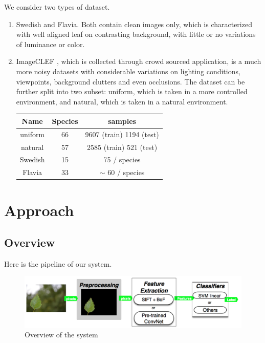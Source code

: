 \documentclass[journal, 10pt]{IEEEtran}
\begin{document}
    We consider two types of dataset.
\begin{enumerate}
  \item Swedish\cite{SwedishLeafDataset} and Flavia\cite{FlaviaDataset}. Both contain clean images only, which is characterized with well aligned leaf on contrasting background, with little or no variations of luminance or color. \\

  \item ImageCLEF \cite{ImageCLEF2013}, which is collected through crowd sourced application, is a much more noisy datasets with considerable variations on lighting conditions, viewpoints, background clutters and even occlusions. The dataset can be further split into two subset: uniform, which is taken in a more controlled environment, and natural, which is taken in a natural environment.
  \begin{centering}
    \centering
      \begin{tabular}{| c | c | c |}
      \hline
      Name    & Species & samples                  \\ \hline
      uniform & 66      & 9607 (train) 1194 (test) \\ \hline
      natural & 57      & 2585 (train) 521  (test) \\ \hline
      Swedish & 15      & 75 / species             \\ \hline
      Flavia  & 33      & $\sim$ 60 / species      \\ \hline
      \end{tabular}
  \end{centering}
\end{enumerate}

\section{Approach}

\subsection{Overview}
Here is the pipeline of our system.
\begin{figure}[H]
  \center
  \includegraphics[width=1.0\linewidth]{overview}
  \caption{ Overview of the system }
  \label{fig:pipeline}
\end{figure}
\end{document}
